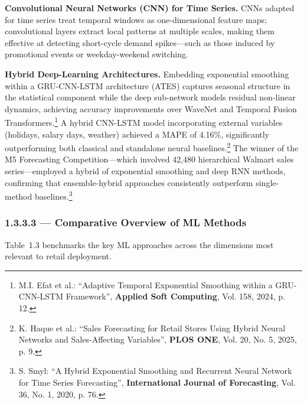 \medskip
\noindent\textbf{Convolutional Neural Networks (CNN) for Time Series.}
CNNs adapted for time series treat temporal windows as one-dimensional
feature maps; convolutional layers extract local patterns at multiple scales,
making them effective at detecting short-cycle demand spikes—such as those
induced by promotional events or weekday-weekend switching.

\medskip
\noindent\textbf{Hybrid Deep-Learning Architectures.}
Embedding exponential smoothing within a GRU-CNN-LSTM architecture (ATES)
captures seasonal structure in the statistical component while the deep
sub-network models residual non-linear dynamics, achieving accuracy
improvements over WaveNet and Temporal Fusion
Transformers.\footnote{M.I. Efat et al.: ``Adaptive Temporal Exponential
Smoothing within a GRU-CNN-LSTM Framework'', \textbf{Applied Soft
Computing}, Vol. 158, 2024, p. 12.} A hybrid CNN-LSTM model incorporating
external variables (holidays, salary days, weather) achieved a MAPE of
4.16\%, significantly outperforming both classical and standalone neural
baselines.\footnote{K. Haque et al.: ``Sales Forecasting for Retail Stores
Using Hybrid Neural Networks and Sales-Affecting Variables'',
\textbf{PLOS ONE}, Vol. 20, No. 5, 2025, p. 9.} The winner of the M5
Forecasting Competition—which involved 42,480 hierarchical Walmart sales
series—employed a hybrid of exponential smoothing and deep RNN methods,
confirming that ensemble-hybrid approaches consistently outperform
single-method baselines.\footnote{S. Smyl: ``A Hybrid Exponential Smoothing
and Recurrent Neural Network for Time Series Forecasting'',
\textbf{International Journal of Forecasting}, Vol. 36, No. 1, 2020, p. 76.}

\subsubsection{1.3.3.3 — Comparative Overview of ML Methods}

Table~1.3 benchmarks the key ML approaches across the dimensions most
relevant to retail deployment.

